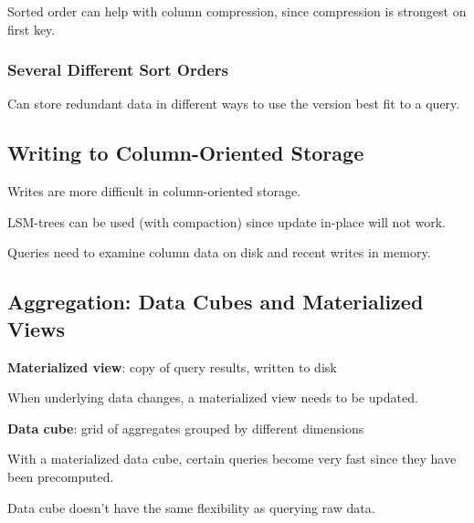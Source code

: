 \documentclass[11pt]{article}
\begin{document}
Sorted order can help with column compression, since compression
is strongest on first key.
\subsubsection{Several Different Sort Orders}
\label{sec:org2f92e19}
Can store redundant data in different ways to use the version
best fit to a query.
\subsection{Writing to Column-Oriented Storage}
\label{sec:orgb6df48a}
Writes are more difficult in column-oriented storage.

LSM-trees can be used (with compaction) since update in-place
will not work.

Queries need to examine column data on disk and recent writes in memory.
\subsection{Aggregation: Data Cubes and Materialized Views}
\label{sec:org8e2b263}
\textbf{Materialized view}: copy of query results, written to disk

When underlying data changes, a materialized view needs to be updated.

\textbf{Data cube}: grid of aggregates grouped by different dimensions

With a materialized data cube, certain queries become very fast since
they have been precomputed.

Data cube doesn't have the same flexibility as querying raw data.
\end{document}

